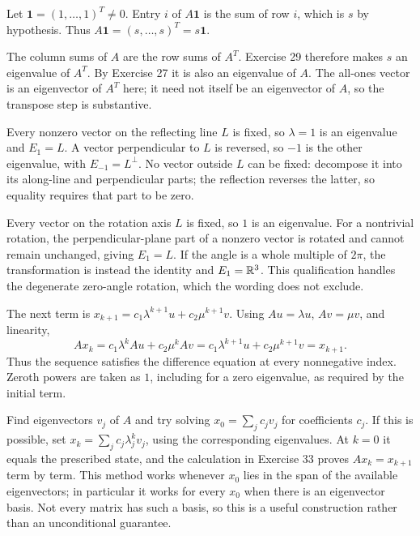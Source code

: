 Let $\mathbf1=(1,\ldots,1)^T\ne0$. Entry $i$ of $A\mathbf1$
is the sum of row $i$, which is $s$ by hypothesis. Thus
$A\mathbf1=(s,\ldots,s)^T=s\mathbf1$.

The column sums of $A$ are the row sums of $A^T$.
Exercise 29 therefore makes $s$ an eigenvalue of $A^T$.
By Exercise 27 it is also an eigenvalue of $A$.
The all-ones vector is an eigenvector of $A^T$ here; it need not
itself be an eigenvector of $A$, so the transpose step is substantive.

Every nonzero vector on the reflecting line $L$ is fixed, so
$\lambda=1$ is an eigenvalue and $E_1=L$.
A vector perpendicular to $L$ is reversed, so $-1$ is the other
eigenvalue, with $E_{-1}=L^\perp$. No vector outside $L$ can
be fixed: decompose it into its along-line and perpendicular parts;
the reflection reverses the latter, so equality requires that part to be zero.

Every vector on the rotation axis $L$ is fixed, so $1$ is an
eigenvalue. For a nontrivial rotation, the perpendicular-plane part
of a nonzero vector is rotated and cannot remain unchanged, giving
$E_1=L$. If the angle is a whole multiple of $2\pi$, the transformation
is instead the identity and $E_1=\mathbb{R}^3$. This qualification handles
the degenerate zero-angle rotation, which the wording does not exclude.

The next term is $x_{k+1}=c_1\lambda^{k+1}u+c_2\mu^{k+1}v$.
Using $Au=\lambda u$, $Av=\mu v$, and linearity,
\[
 Ax_k=c_1\lambda^kAu+c_2\mu^kAv
 =c_1\lambda^{k+1}u+c_2\mu^{k+1}v=x_{k+1}.
\]
Thus the sequence satisfies the difference equation at every nonnegative
index. Zeroth powers are taken as $1$, including for a zero eigenvalue,
as required by the initial term.

Find eigenvectors $v_j$ of $A$ and try solving
$x_0=\sum_jc_jv_j$ for coefficients $c_j$. If this is possible,
set $x_k=\sum_jc_j\lambda_j^kv_j$, using the corresponding
eigenvalues. At $k=0$ it equals the prescribed state, and the
calculation in Exercise 33 proves $Ax_k=x_{k+1}$ term by term.
This method works whenever $x_0$ lies in the span of the available
eigenvectors; in particular it works for every $x_0$ when there is
an eigenvector basis. Not every matrix has such a basis, so this is
a useful construction rather than an unconditional guarantee.

